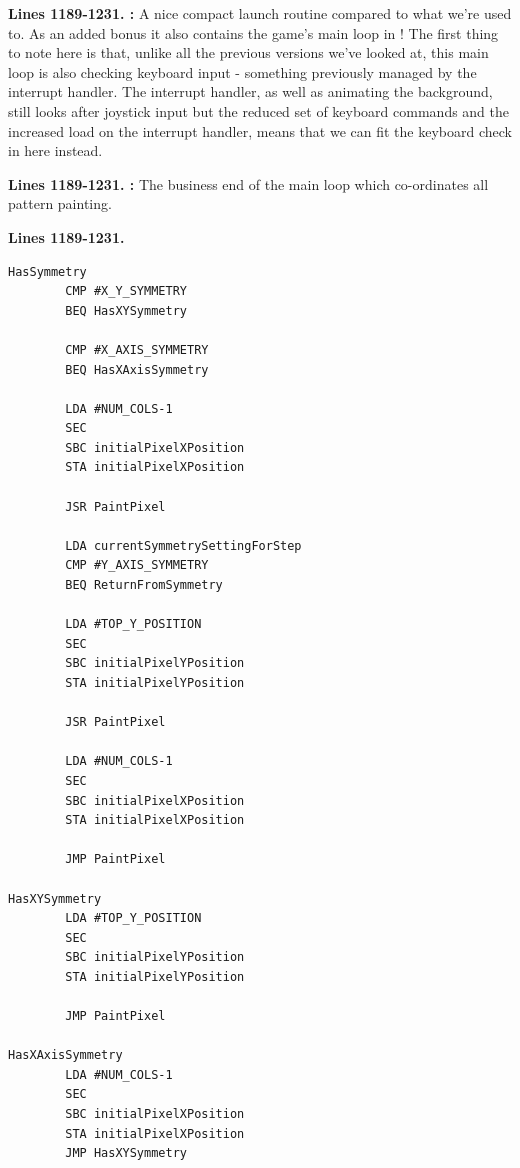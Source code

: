 \textbf{Lines 1189-1231. :} A nice compact launch routine compared to what we're used to. As an added
bonus it also contains the game's main loop in ! The first thing to note here is that, unlike all the previous
versions we've looked at, this main loop is also checking keyboard input - something previously managed by the interrupt handler. The
interrupt handler, as well as animating the background, still looks after joystick input but the reduced set of keyboard commands and
the increased load on the interrupt handler, means that we can fit the keyboard check in here instead.

\textbf{Lines 1189-1231. :} The business end of the main loop which co-ordinates all pattern
painting.

\clearpage
\textbf{Lines 1189-1231. } 
\begin{lstlisting}[caption = All the pattern data structures in Psychedelia organized into a set of arrays.]
HasSymmetry   
        CMP #X_Y_SYMMETRY
        BEQ HasXYSymmetry

        CMP #X_AXIS_SYMMETRY
        BEQ HasXAxisSymmetry

        LDA #NUM_COLS-1
        SEC 
        SBC initialPixelXPosition
        STA initialPixelXPosition

        JSR PaintPixel

        LDA currentSymmetrySettingForStep
        CMP #Y_AXIS_SYMMETRY
        BEQ ReturnFromSymmetry

        LDA #TOP_Y_POSITION
        SEC 
        SBC initialPixelYPosition
        STA initialPixelYPosition

        JSR PaintPixel

        LDA #NUM_COLS-1
        SEC 
        SBC initialPixelXPosition
        STA initialPixelXPosition

        JMP PaintPixel

HasXYSymmetry   
        LDA #TOP_Y_POSITION
        SEC 
        SBC initialPixelYPosition
        STA initialPixelYPosition

        JMP PaintPixel

HasXAxisSymmetry   
        LDA #NUM_COLS-1
        SEC 
        SBC initialPixelXPosition
        STA initialPixelXPosition
        JMP HasXYSymmetry
\end{lstlisting}
\clearpage

